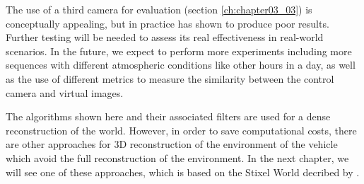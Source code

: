 The use of a third camera for evaluation (section \ref{ch:chapter03_03}) is conceptually appealing, but in practice has shown to produce poor results. Further testing will be needed to assess its real effectiveness in real-world scenarios. In the future, we expect to perform more experiments including more sequences with different atmospheric conditions like other hours in a day, as well as the use of different metrics to measure the similarity between the control camera and virtual images.

The algorithms shown here and their associated filters are used for a dense reconstruction of the world. However, in order to save computational costs, there are other approaches for 3D reconstruction of the environment of the vehicle which avoid the full reconstruction of the environment. In the next chapter, we will see one of these approaches, which is based on the Stixel World decribed by \cite{badino2009stixel}.
